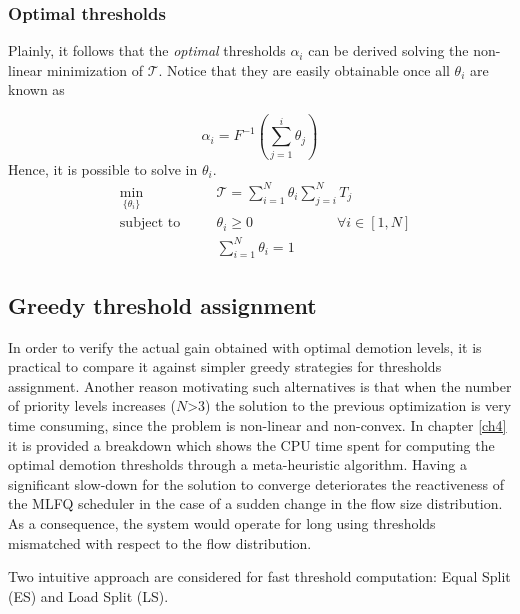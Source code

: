 \subsubsection{Optimal thresholds}
\label{sec:pias-queueing-model}
Plainly, it follows that the \textit{optimal} thresholds $\alpha_i$ can be derived solving the non-linear minimization of $\mathcal{T}$. Notice that they are easily obtainable once all $\theta_i$ are known as 

\[
\alpha_i = F^{-1}(\sum_{j=1}^{i}\theta_j)
\]
Hence, it is possible to solve in $\theta_i$.
\begin{equation}
\label{eq::costfunction}
\begin{aligned}
&\underset{\{\theta_i\}}{\text{min}} \quad  & &\mathcal{T} = 
\sum_{i=1}^{N} \theta_i \sum_{j=i}^{N}T_j \\
&\text{subject to} \quad  & &\theta_i \ge 0 \qquad \qquad \qquad \forall i \in [1,N]  \\
& & & \sum_{i=1}^{N} \theta_i = 1 
\end{aligned}
\end{equation}

\subsection{Greedy threshold assignment}
\label{sec:greedy-thresh}
In order to verify the actual gain obtained with optimal demotion levels, it is practical to compare it against simpler greedy strategies for thresholds assignment. Another reason motivating such alternatives is that when the number of priority levels increases ($N$>3) the solution to the previous optimization is very time consuming, since the problem is non-linear and non-convex. In chapter \ref{ch4} it is provided a breakdown which shows the CPU time spent for computing the optimal demotion thresholds through a meta-heuristic algorithm. 
Having a significant slow-down for the solution to converge deteriorates the reactiveness of the MLFQ scheduler in the case of a sudden change in the flow size distribution. As a consequence, the system would operate for long using thresholds mismatched with respect to the flow distribution.

Two intuitive approach are considered for fast threshold computation: Equal Split (ES) and Load Split (LS). 

